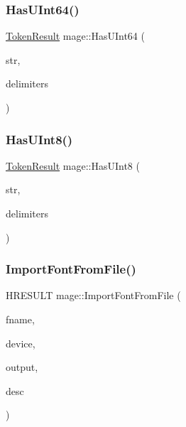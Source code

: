 \hypertarget{namespacemage_a49b54d6a4244d71dc63237ead3a6307e}{}\label{namespacemage_a49b54d6a4244d71dc63237ead3a6307e} 
\subsubsection{\texorpdfstring{Has\+U\+Int64()}{HasUInt64()}}
{\footnotesize\ttfamily \hyperlink{namespacemage_a2178ba2411db5912f41b2e7698c2037d}{Token\+Result} mage\+::\+Has\+U\+Int64 (\begin{DoxyParamCaption}\item[{const char $\ast$}]{str,  }\item[{const char $\ast$}]{delimiters }\end{DoxyParamCaption})}

\hypertarget{namespacemage_ad4371436b14bc05f22abde780bf07be5}{}\label{namespacemage_ad4371436b14bc05f22abde780bf07be5} 
\subsubsection{\texorpdfstring{Has\+U\+Int8()}{HasUInt8()}}
{\footnotesize\ttfamily \hyperlink{namespacemage_a2178ba2411db5912f41b2e7698c2037d}{Token\+Result} mage\+::\+Has\+U\+Int8 (\begin{DoxyParamCaption}\item[{const char $\ast$}]{str,  }\item[{const char $\ast$}]{delimiters }\end{DoxyParamCaption})}

\hypertarget{namespacemage_a2ea37125a432c1c2fb7e87956868329a}{}\label{namespacemage_a2ea37125a432c1c2fb7e87956868329a} 
\subsubsection{\texorpdfstring{Import\+Font\+From\+File()}{ImportFontFromFile()}}
{\footnotesize\ttfamily H\+R\+E\+S\+U\+LT mage\+::\+Import\+Font\+From\+File (\begin{DoxyParamCaption}\item[{const wstring \&}]{fname,  }\item[{\hyperlink{namespacemage_ae74f374780900893caa5555d1031fd79}{Com\+Ptr}$<$ I\+D3\+D11\+Device2 $>$}]{device,  }\item[{\hyperlink{structmage_1_1_sprite_font_output}{Sprite\+Font\+Output} \&}]{output,  }\item[{const \hyperlink{structmage_1_1_sprite_font_descriptor}{Sprite\+Font\+Descriptor} \&}]{desc }\end{DoxyParamCaption})}

